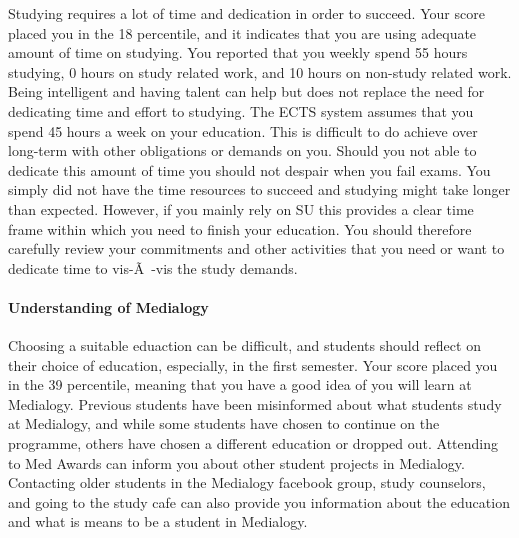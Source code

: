 \documentclass[]{article}
\let\oldparagraph\paragraph
\renewcommand{\paragraph}[1]{\oldparagraph{#1}\mbox{}}
\begin{document}
Studying requires a lot of time and dedication in order to succeed. Your
score placed you in the 18 percentile, and it indicates that you are
using adequate amount of time on studying. You reported that you weekly
spend 55 hours studying, 0 hours on study related work, and 10 hours on
non-study related work. Being intelligent and having talent can help but
does not replace the need for dedicating time and effort to studying.
The ECTS system assumes that you spend 45 hours a week on your
education. This is difficult to do achieve over long-term with other
obligations or demands on you. Should you not able to dedicate this
amount of time you should not despair when you fail exams. You simply
did not have the time resources to succeed and studying might take
longer than expected. However, if you mainly rely on SU this provides a
clear time frame within which you need to finish your education. You
should therefore carefully review your commitments and other activities
that you need or want to dedicate time to vis-Ã~-vis the study demands.

\paragraph{Understanding of Medialogy}\label{understanding-of-medialogy}

Choosing a suitable eduaction can be difficult, and students should
reflect on their choice of education, especially, in the first semester.
Your score placed you in the 39 percentile, meaning that you have a good
idea of you will learn at Medialogy. Previous students have been
misinformed about what students study at Medialogy, and while some
students have chosen to continue on the programme, others have chosen a
different education or dropped out. Attending to Med Awards can inform
you about other student projects in Medialogy. Contacting older students
in the Medialogy facebook group, study counselors, and going to the
study cafe can also provide you information about the education and what
is means to be a student in Medialogy.
\end{document}
